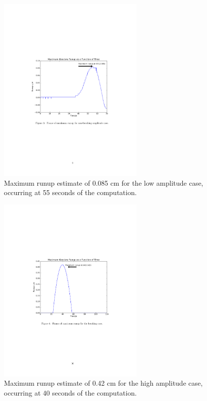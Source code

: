 \begin{figure}[ht]
\hfil\includegraphics[width=2.8in]{bp4/MaxRunup0185.pdf}\hfil
\caption{\label{MaxRunup0185} 
Maximum runup estimate of 0.085 cm for the low amplitude case, occurring at 55 seconds of the computation. 
}
\end{figure}

\begin{figure}[ht]
\hfil\includegraphics[width=2.8in]{bp4/MaxRunup3.pdf}\hfil
\caption{\label{MaxRunup3} 
Maximum runup estimate of 0.42 cm for the high amplitude case, occurring at 40 seconds of the computation. 
}
\end{figure}

